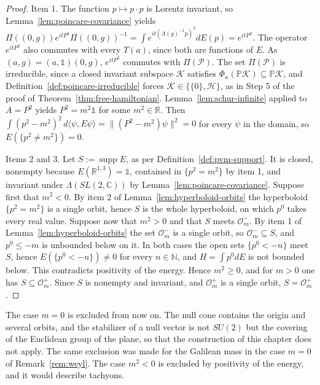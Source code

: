 	\begin{proof}
		Item 1. The function $p\mapsto p\cdot p$ is Lorentz invariant, so Lemma~\ref{lem:poincare-covariance} yields $\Pi((0,g))e^{itP^2}\Pi((0,g))^{-1}=\int e^{it(\Lambda(g)^{-1}p)^2}dE(p)=e^{itP^2}$. The operator $e^{itP^2}$ also commutes with every $T(a)$, since both are functions of $E$. As $(a,g)=(a,\mathbb{1})(0,g)$, $e^{itP^2}$ commutes with $\Pi(\mathcal{P})$. The set $\Pi(\mathcal{P})$ is irreducible, since a closed invariant subspace $\mathcal{K}$ satisfies $\Phi_\kappa(\mathbb{P}\mathcal{K})\subseteq\mathbb{P}\mathcal{K}$, and Definition~\ref{def:poincare-irreducible} forces $\mathcal{K}\in\{\{0\},\mathcal{H}\}$, as in Step 5 of the proof of Theorem~\ref{thm:free-hamiltonian}. Lemma~\ref{lem:schur-infinite} applied to $A=P^2$ yields $P^2=m^2\mathbb{1}$ for some $m^2\in\mathbb{R}$. Then $\int(p^2-m^2)^2\,d\langle\psi,E\psi\rangle=\|(P^2-m^2)\psi\|^2=0$ for every $\psi$ in the domain, so $E(\{p^2\neq m^2\})=0$.
		
		Items 2 and 3. Let $S:=\operatorname{supp}E$, as per Definition~\ref{def:pvm-support}. It is closed, nonempty because $E(\mathbb{R}^{1,3})=\mathbb{1}$, contained in $\{p^2=m^2\}$ by item 1, and invariant under $\Lambda(SL(2,\mathbb{C}))$ by Lemma~\ref{lem:poincare-covariance}. Suppose first that $m^2<0$. By item 2 of Lemma~\ref{lem:hyperboloid-orbits} the hyperboloid $\{p^2=m^2\}$ is a single orbit, hence $S$ is the whole hyperboloid, on which $p^0$ takes every real value. Suppose now that $m^2>0$ and that $S$ meets $\mathcal{O}_m^-$. By item 1 of Lemma~\ref{lem:hyperboloid-orbits} the set $\mathcal{O}_m^-$ is a single orbit, so $\mathcal{O}_m^-\subseteq S$, and $p^0\leq-m$ is unbounded below on it. In both cases the open sets $\{p^0<-n\}$ meet $S$, hence $E(\{p^0<-n\})\neq0$ for every $n\in\mathbb{N}$, and $H=\int p^0dE$ is not bounded below. This contradicts positivity of the energy. Hence $m^2\geq0$, and for $m>0$ one has $S\subseteq\mathcal{O}_m^+$. Since $S$ is nonempty and invariant, and $\mathcal{O}_m^+$ is a single orbit, $S=\mathcal{O}_m^+$.
	\end{proof}
	
	\begin{remark}\label{rem:massless}
		The case $m=0$ is excluded from now on. The null cone contains the origin and several orbits, and the stabilizer of a null vector is not $SU(2)$ but the covering of the Euclidean group of the plane, so that the construction of this chapter does not apply. The same exclusion was made for the Galilean mass in the case $m=0$ of Remark~\ref{rem:weyl}. The case $m^2<0$ is excluded by positivity of the energy, and it would describe tachyons.
	\end{remark}
	

